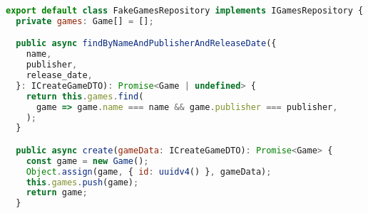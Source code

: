 \begin{lstlisting}[language=JavaScript, caption={Outra implementação do IGamesRepository},captionpos=b, label=alg:fakegamesrepository]
export default class FakeGamesRepository implements IGamesRepository {
  private games: Game[] = [];

  public async findByNameAndPublisherAndReleaseDate({
    name,
    publisher,
    release_date,
  }: ICreateGameDTO): Promise<Game | undefined> {
    return this.games.find(
      game => game.name === name && game.publisher === publisher,
    );
  }

  public async create(gameData: ICreateGameDTO): Promise<Game> {
    const game = new Game();
    Object.assign(game, { id: uuidv4() }, gameData);
    this.games.push(game);
    return game;
  }
\end{lstlisting}